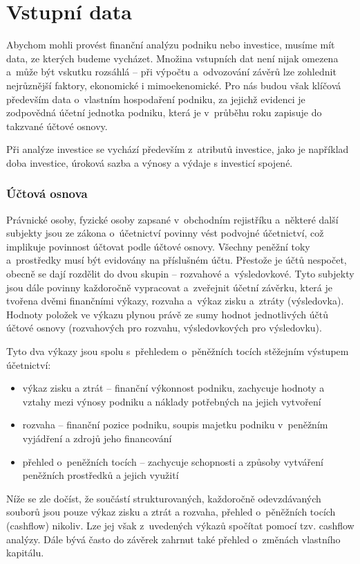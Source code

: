 \section{Vstupní data}
Abychom mohli provést finanční analýzu podniku nebo investice, musíme mít data, ze kterých budeme vycházet. Množina vstupních dat není nijak omezena a~může být vskutku rozsáhlá -- při výpočtu a~odvozování závěrů lze zohlednit nejrůznější faktory, ekonomické i mimoekenomické. Pro nás budou však klíčová především data o~vlastním hospodaření podniku, za jejichž evidenci je zodpovědná účetní jednotka podniku, která je v~průběhu roku zapisuje do takzvané účtové osnovy. 

Při analýze investice se vychází především z~atributů investice, jako je například doba investice, úroková sazba a výnosy a výdaje s investicí spojené.

\subsubsection{Účtová osnova}
Právnické osoby, fyzické osoby zapsané v~obchodním rejistříku a~některé další subjekty jsou ze zákona o~účetnictví povinny vést podvojné účetnictví, což implikuje povinnost účtovat podle účtové osnovy. Všechny peněžní toky a~prostředky musí být evidovány na příslušném účtu. Přestože je účtů nespočet, obecně se dají rozdělit do dvou skupin -- rozvahové a~výsledovkové. Tyto subjekty jsou dále povinny každoročně vypracovat a~zveřejnit účetní závěrku, která je tvořena dvěmi finančními výkazy, rozvaha a~výkaz zisku a~ztráty (výsledovka). Hodnoty položek ve výkazu plynou právě ze sumy hodnot jednotlivých účtů účtové osnovy (rozvahových pro rozvahu, výsledovkových pro výsledovku).

Tyto dva výkazy jsou spolu s~přehledem o~pěněžních tocích stěžejním výstupem účetnictví:

\begin{itemize}
	\item výkaz zisku a ztrát -- finanční výkonnost podniku, zachycuje hodnoty a vztahy mezi výnosy podniku a náklady potřebných na jejich vytvoření
	\item rozvaha -- finanční pozice podniku, soupis majetku podniku v~peněžním vyjádření a zdrojů jeho financování
	\item přehled o~peněžních tocích -- zachycuje schopnosti a způsoby vytváření peněžních prostředků a jejich využití
\end{itemize}


Níže se zle dočíst, že součástí strukturovaných, každoročně odevzdávaných souborů jsou pouze výkaz zisku a ztrát a rozvaha, přehled o~pěněžních tocích (cashflow) nikoliv. Lze jej však z~uvedených výkazů spočítat pomocí tzv. cashflow analýzy. Dále bývá často do závěrek zahrnut také přehled o~změnách vlastního kapitálu.


